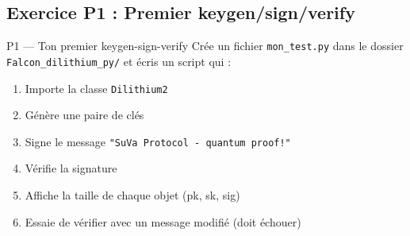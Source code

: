\documentclass[12pt, a4paper]{article}
\begin{document}
\subsection{Exercice P1 : Premier keygen/sign/verify}

\begin{exercice}{P1 --- Ton premier keygen-sign-verify}
Crée un fichier \texttt{mon\_test.py} dans le dossier \texttt{Falcon\_dilithium\_py/} et écris un script qui :
\begin{enumerate}
  \item Importe la classe \texttt{Dilithium2}
  \item Génère une paire de clés
  \item Signe le message \texttt{"SuVa Protocol - quantum proof!"}
  \item Vérifie la signature
  \item Affiche la taille de chaque objet (pk, sk, sig)
  \item Essaie de vérifier avec un message modifié (doit échouer)
\end{enumerate}
\end{exercice}
\end{document}
